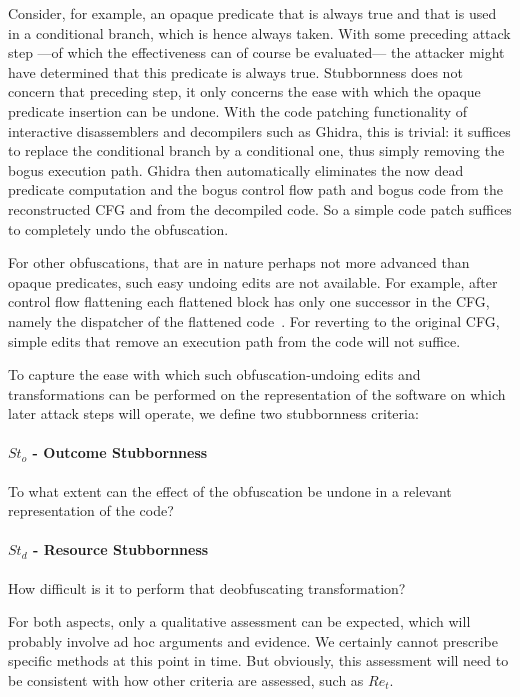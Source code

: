 Consider, for example, an opaque predicate that is always true and that is used in a conditional branch, which is hence always taken. With some preceding attack step ---of which the effectiveness can of course be evaluated--- the attacker might have determined that this predicate is always true. Stubbornness does not concern that preceding step, it only concerns the ease with which the opaque predicate insertion can be undone. With the code patching functionality of interactive disassemblers and decompilers such as Ghidra, this is trivial: it suffices to replace the conditional branch by a conditional one, thus simply removing the bogus execution path. Ghidra then automatically eliminates the now dead predicate computation and the bogus control flow path and bogus code from the reconstructed CFG and from the decompiled code. So a simple code patch suffices to completely undo the obfuscation. 

For other obfuscations, that are in nature perhaps not more advanced than opaque predicates, such easy undoing edits are not available. For example, after control flow flattening each flattened block has only one successor in the CFG, namely the dispatcher of the flattened code~\cite{flattening}. For reverting to the original CFG, simple edits that remove an execution path from the code will not suffice. 

To capture the ease with which such obfuscation-undoing edits and transformations can be performed on the representation of the software on which later attack steps will operate, we define two stubbornness criteria: 

\paragraph{$St_o$ - Outcome Stubbornness} To what extent can the effect of the obfuscation be undone in a relevant representation of the code? 

\paragraph{$St_d$ - Resource Stubbornness} How difficult is it to perform that deobfuscating transformation? 

\vspace{0.2cm}

For both aspects, only a qualitative assessment can be expected, which will probably involve ad hoc arguments and evidence. We certainly cannot prescribe specific methods at this point in time. But obviously, this assessment will need to be consistent with how other criteria are assessed, such as $Re_t$.

